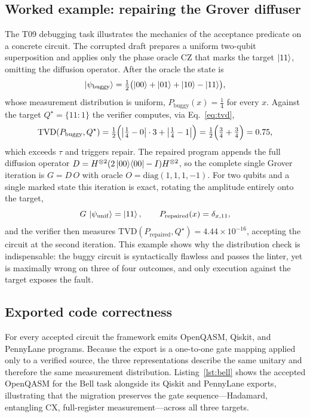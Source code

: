 \documentclass[11pt,a4paper]{article}
\newcommand{\tvd}{\mathrm{TVD}}
\begin{document}
\subsection{Worked example: repairing the Grover diffuser}
The T09 debugging task illustrates the mechanics of the acceptance predicate on a concrete circuit. The corrupted draft prepares a uniform two-qubit superposition and applies only the phase oracle $\mathrm{CZ}$ that marks the target $\ket{11}$, omitting the diffusion operator. After the oracle the state is
\begin{equation}
\ket{\psi_{\mathrm{buggy}}}=\tfrac{1}{2}\bigl(\ket{00}+\ket{01}+\ket{10}-\ket{11}\bigr),
\label{eq:grovbug}
\end{equation}
whose measurement distribution is uniform, $P_{\mathrm{buggy}}(x)=\tfrac14$ for every $x$. Against the target $Q^\star=\{11\!:\!1\}$ the verifier computes, via Eq.~\eqref{eq:tvd},
\begin{equation}
\tvd(P_{\mathrm{buggy}},Q^\star)=\tfrac12\Bigl(\bigl|\tfrac14-0\bigr|\cdot 3+\bigl|\tfrac14-1\bigr|\Bigr)=\tfrac12\Bigl(\tfrac34+\tfrac34\Bigr)=0.75,
\label{eq:grovtvd}
\end{equation}
which exceeds $\tau$ and triggers repair. The repaired program appends the full diffusion operator $D=H^{\otimes2}(2\ket{00}\!\bra{00}-I)H^{\otimes2}$, so the complete single Grover iteration is $G=D\,O$ with oracle $O=\mathrm{diag}(1,1,1,-1)$. For two qubits and a single marked state this iteration is exact, rotating the amplitude entirely onto the target,
\begin{equation}
G\,\ket{\psi_{\mathrm{unif}}}=\ket{11},\qquad P_{\mathrm{repaired}}(x)=\delta_{x,11},
\label{eq:grovfix}
\end{equation}
and the verifier then measures $\tvd(P_{\mathrm{repaired}},Q^\star)=4.44\times10^{-16}$, accepting the circuit at the second iteration. This example shows why the distribution check is indispensable: the buggy circuit is syntactically flawless and passes the linter, yet is maximally wrong on three of four outcomes, and only execution against the target exposes the fault.

\subsection{Exported code correctness}
For every accepted circuit the framework emits OpenQASM, Qiskit, and PennyLane programs. Because the export is a one-to-one gate mapping applied only to a verified source, the three representations describe the same unitary and therefore the same measurement distribution. Listing~\ref{lst:bell} shows the accepted OpenQASM for the Bell task alongside its Qiskit and PennyLane exports, illustrating that the migration preserves the gate sequence---Hadamard, entangling $\mathrm{CX}$, full-register measurement---across all three targets.
\end{document}
